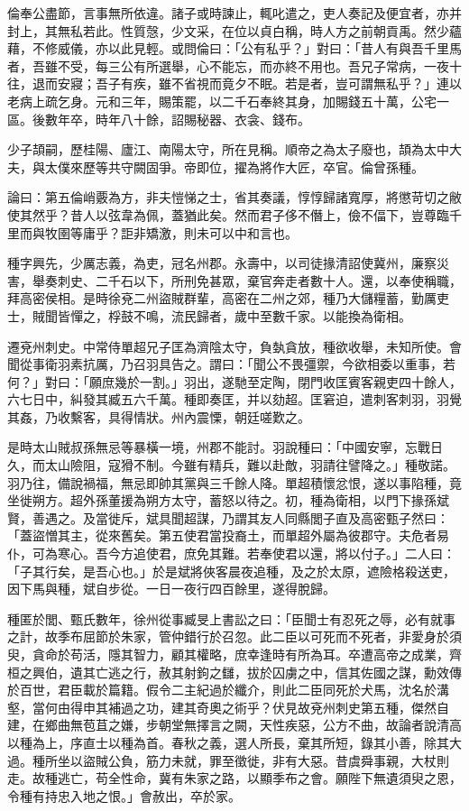 \begin{pinyinscope}
倫奉公盡節，言事無所依違。諸子或時諫止，輒叱遣之，吏人奏記及便宜者，亦并封上，其無私若此。性質愨，少文采，在位以貞白稱，時人方之前朝貢禹。然少蘊藉，不修威儀，亦以此見輕。或問倫曰：「公有私乎？」對曰：「昔人有與吾千里馬者，吾雖不受，每三公有所選舉，心不能忘，而亦終不用也。吾兄子常病，一夜十往，退而安寢；吾子有疾，雖不省視而竟夕不眠。若是者，豈可謂無私乎？」連以老病上疏乞身。元和三年，賜策罷，以二千石奉終其身，加賜錢五十萬，公宅一區。後數年卒，時年八十餘，詔賜秘器、衣衾、錢布。

少子頡嗣，歷桂陽、廬江、南陽太守，所在見稱。順帝之為太子廢也，頡為太中大夫，與太僕來歷等共守闕固爭。帝即位，擢為將作大匠，卒官。倫曾孫種。

論曰：第五倫峭覈為方，非夫愷悌之士，省其奏議，惇惇歸諸寬厚，將懲苛切之敝使其然乎？昔人以弦韋為佩，蓋猶此矣。然而君子侈不僭上，儉不偪下，豈尊臨千里而與牧圉等庸乎？詎非矯激，則未可以中和言也。

種字興先，少厲志義，為吏，冠名州郡。永壽中，以司徒掾清詔使冀州，廉察災害，舉奏刺史、二千石以下，所刑免甚眾，棄官奔走者數十人。還，以奉使稱職，拜高密侯相。是時徐兗二州盜賊群輩，高密在二州之郊，種乃大儲糧蓄，勤厲吏士，賊聞皆憚之，桴鼓不鳴，流民歸者，歲中至數千家。以能換為衛相。

遷兗州刺史。中常侍單超兄子匡為濟陰太守，負埶貪放，種欲收舉，未知所使。會聞從事衛羽素抗厲，乃召羽具告之。謂曰：「聞公不畏彊禦，今欲相委以重事，若何？」對曰：「願庶幾於一割。」羽出，遂馳至定陶，閉門收匡賓客親吏四十餘人，六七日中，糾發其臧五六千萬。種即奏匡，并以劾超。匡窘迫，遣刺客刺羽，羽覺其姦，乃收繫客，具得情狀。州內震慄，朝廷嗟歎之。

是時太山賊叔孫無忌等暴橫一境，州郡不能討。羽說種曰：「中國安寧，忘戰日久，而太山險阻，寇猾不制。今雖有精兵，難以赴敵，羽請往譬降之。」種敬諾。羽乃往，備說禍福，無忌即帥其黨與三千餘人降。單超積懷忿恨，遂以事陷種，竟坐徙朔方。超外孫董援為朔方太守，蓄怒以待之。初，種為衛相，以門下掾孫斌賢，善遇之。及當徙斥，斌具聞超謀，乃謂其友人同縣閭子直及高密甄子然曰：「蓋盜憎其主，從來舊矣。第五使君當投裔土，而單超外屬為彼郡守。夫危者易仆，可為寒心。吾今方追使君，庶免其難。若奉使君以還，將以付子。」二人曰：「子其行矣，是吾心也。」於是斌將俠客晨夜追種，及之於太原，遮險格殺送吏，因下馬與種，斌自步從。一日一夜行四百餘里，遂得脫歸。

種匿於閭、甄氏數年，徐州從事臧旻上書訟之曰：「臣聞士有忍死之辱，必有就事之計，故季布屈節於朱家，管仲錯行於召忽。此二臣以可死而不死者，非愛身於須臾，貪命於苟活，隱其智力，顧其權略，庶幸逢時有所為耳。卒遭高帝之成業，齊桓之興伯，遺其亡逃之行，赦其射鉤之讎，拔於囚虜之中，信其佐國之謀，勳效傳於百世，君臣載於篇籍。假令二主紀過於纖介，則此二臣同死於犬馬，沈名於溝壑，當何由得申其補過之功，建其奇奧之術乎？伏見故兗州刺史第五種，傑然自建，在鄉曲無苞苴之嫌，步朝堂無擇言之闕，天性疾惡，公方不曲，故論者說清高以種為上，序直士以種為首。春秋之義，選人所長，棄其所短，錄其小善，除其大過。種所坐以盜賊公負，筋力未就，罪至徵徙，非有大惡。昔虞舜事親，大杖則走。故種逃亡，苟全性命，冀有朱家之路，以顯季布之會。願陛下無遺須臾之恩，令種有持忠入地之恨。」會赦出，卒於家。


\end{pinyinscope}
